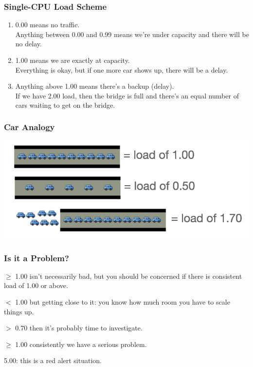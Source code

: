 \begin{frame}
\frametitle{Single-CPU Load Scheme}


\begin{changemargin}{1cm}
\begin{enumerate}
	\item 0.00 means no traffic. \\
    Anything between 0.00 and 0.99 means we're under capacity and there will be no delay.\\[1em]
	\item 1.00 means we are exactly at capacity. \\
    Everything is okay, but if one more car shows up, there will be a delay.\\[1em]
	\item Anything above 1.00 means there's a backup (delay). \\
    If we have 2.00 load, then the bridge is full and there's an equal number of cars waiting to get on the bridge. 
\end{enumerate}
\end{changemargin}

\end{frame}



\begin{frame}
\frametitle{Car Analogy}

\begin{center}
	\includegraphics[width=\textwidth]{images/car-analogy.png}
\end{center}

\end{frame}



\begin{frame}
\frametitle{Is it a Problem?}


\begin{changemargin}{1cm}
$\ge$ 1.00 isn't necessarily bad, but you should be concerned if there is consistent load of 1.00 or above. 

$<$ 1.00 but getting close to it: you know how much room you have to scale things up.

$>$ 0.70 then it's probably time to investigate.

$\ge$ 1.00 consistently we have a serious problem. 

5.00: this is a red alert situation.
\end{changemargin}

\end{frame}



